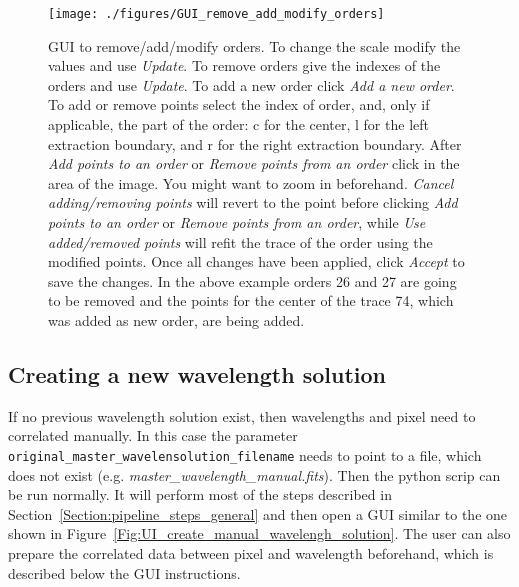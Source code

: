 \documentclass[10pt,a4paper]{article}
\begin{document}
\begin{figure} 
  \begin{center}
    \texttt{[image: ./figures/GUI\_remove\_add\_modify\_orders]}
  \end{center} 
  \caption{GUI to remove/add/modify orders. To change the scale modify the values and use \textit{Update}. To remove orders give the indexes of the orders and use \textit{Update}. To add a new order click \textit{Add a new order}. To add or remove points select the index of order, and, only if applicable, the part of the order: c for the center, l for the left extraction boundary, and r for the right extraction boundary. After \textit{Add points to an order} or \textit{Remove points from an order} click in the area of the image. You might want to zoom in beforehand. \textit{Cancel adding/removing points} will revert to the point before clicking \textit{Add points to an order} or \textit{Remove points from an order}, while \textit{Use added/removed points} will refit the trace of the order using the modified points. Once all changes have been applied, click \textit{Accept} to save the changes.
    \newline
    In the above example orders 26 and 27 are going to be removed and the points for the center of the trace 74, which was added as new order, are being added.
    \label{Fig:GUI_remove_add_modify_orders}}
\end{figure}



\subsection{Creating a new wavelength solution}
\label{section:create_new_wave_solution}
If no previous wavelength solution exist, then wavelengths and pixel need to correlated manually. In this case the parameter \verb|original_master_wavelensolution_filename| needs to point to a file, which does not exist (e.g. \textit{master\_wavelength\_manual.fits}). Then the python scrip can be run normally. It will perform most of the steps described in Section~\ref{Section:pipeline_steps_general} and then open a GUI similar to the one shown in Figure~\ref{Fig:UI_create_manual_wavelengh_solution}. The user can also prepare the correlated data between pixel and wavelength beforehand, which is described below the GUI instructions.
\end{document}
